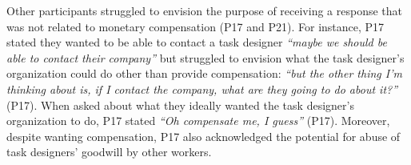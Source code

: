 Other participants struggled to envision the purpose of receiving a response that was not related to monetary compensation (P17 and P21). For instance, P17 stated they wanted to be able to contact a task designer \textit{``maybe we should be able to contact their company''} but struggled to envision what the task designer's organization could do other than provide compensation: \textit{``but the other thing I'm thinking about is, if I contact the company, what are they going to do about it?''} (P17). When asked about what they ideally wanted the task designer's organization to do, P17 stated \textit{``Oh compensate me, I guess''} (P17). Moreover, despite wanting compensation, P17 also acknowledged the potential for abuse of task designers' goodwill by other workers. 

